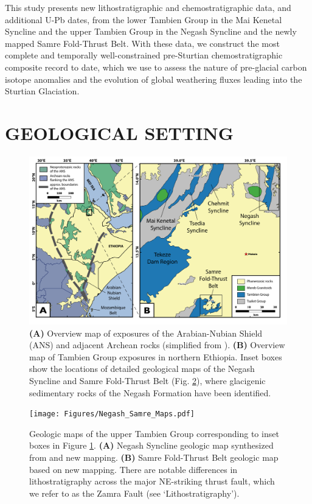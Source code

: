 \documentclass[11pt,letterpaper]{article}
\begin{document}
This study presents new lithostratigraphic and chemostratigraphic data, and additional U-Pb dates, from the lower Tambien Group in the Mai Kenetal Syncline and the upper Tambien Group in the Negash Syncline and the newly mapped Samre Fold-Thrust Belt. With these data, we construct the most complete and temporally well-constrained pre-Sturtian chemostratigraphic composite record to date, which we use to assess the nature of pre-glacial carbon isotope anomalies and the evolution of global weathering fluxes leading into the Sturtian Glaciation.

\section*{GEOLOGICAL SETTING \label{sec:GEOLOGICALSETTING}}

\begin{figure}[h!]
\begin{center}
	\includegraphics[width=\textwidth]{Figures/Overview_Map.pdf}
	\caption{\textbf{(A)} Overview map of exposures of the Arabian-Nubian Shield (ANS) and adjacent Archean rocks (simplified from \citealp{Johnson2014a}). \textbf{(B)} Overview map of Tambien Group exposures in northern Ethiopia. Inset boxes show the locations of detailed geological maps of the Negash Syncline and Samre Fold-Thrust Belt (Fig. \ref{fig:Negash_Samre_Maps}), where glacigenic sedimentary rocks of the Negash Formation have been identified.}
	\label{fig:Overview_Map}
\end{center}
\end{figure}

\begin{figure}[h!]
\begin{center}
	\texttt{[image: Figures/Negash\_Samre\_Maps.pdf]}
	\caption{Geologic maps of the upper Tambien Group corresponding to inset boxes in Figure \ref{fig:Overview_Map}. \textbf{(A)} Negash Syncline geologic map synthesized from \citet{Beyth2003a} and new mapping. \textbf{(B)} Samre Fold-Thrust Belt geologic map based on new mapping. There are notable differences in lithostratigraphy across the major NE-striking thrust fault, which we refer to as the Zamra Fault (see `Lithostratigraphy').}
	\label{fig:Negash_Samre_Maps}
\end{center}
\end{figure}
\end{document}
